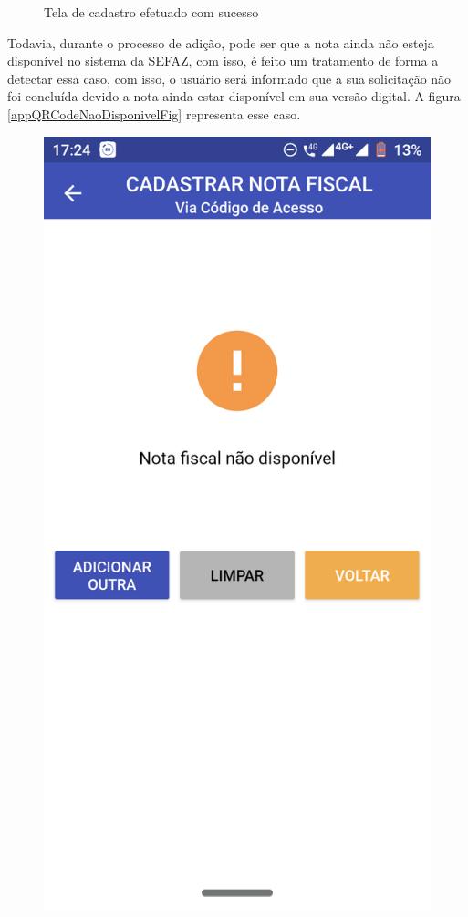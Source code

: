 \begin{figure}[h]
    \caption{Tela de cadastro efetuado com sucesso}
    \label{appQRCodeSucessoFig}
\end{figure}

\newpage
Todavia, durante o processo de adição, pode ser que a nota ainda não esteja disponível no sistema da SEFAZ, com isso, é feito um tratamento de forma a detectar essa caso, com isso, o usuário será informado que a sua solicitação não foi concluída devido a nota ainda estar disponível em sua versão digital. A figura \ref{appQRCodeNaoDisponivelFig} representa esse caso.

\begin{figure}[h]
    \centering
    \includegraphics[scale=0.15]{tcc/figures/app/app_codigo_acesso_nao_disponivel.png}

\end{figure}
